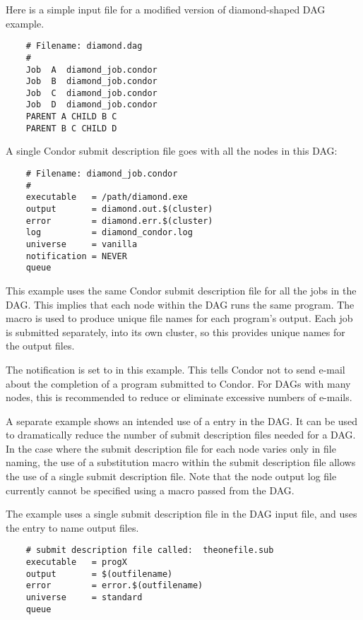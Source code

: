 Here is a simple input file for a 
modified version of diamond-shaped DAG example.

\begin{verbatim}
	# Filename: diamond.dag
	#
	Job  A  diamond_job.condor 
	Job  B  diamond_job.condor 
	Job  C  diamond_job.condor	
	Job  D  diamond_job.condor
	PARENT A CHILD B C
	PARENT B C CHILD D
\end{verbatim}

A single Condor submit description file goes with all the nodes
in this DAG:

\begin{verbatim}
	# Filename: diamond_job.condor
	#
	executable   = /path/diamond.exe
	output       = diamond.out.$(cluster)
	error        = diamond.err.$(cluster)
	log          = diamond_condor.log
	universe     = vanilla
	notification = NEVER
	queue
\end{verbatim}

This example uses the same Condor submit description file
for all the jobs in the DAG.
This implies that each node within the DAG runs the
same program.
The  macro
is used to produce unique file names for each program's output.
Each job is submitted separately, into its own cluster,
so this provides unique names for the output files.

The notification is set to \verb@NEVER@ in this example.
This tells Condor not to send e-mail about the completion of a program
submitted to Condor.
For DAGs with many nodes, this is recommended
to reduce or eliminate excessive numbers of e-mails.

A separate example shows an intended use of a  entry
in the DAG.
It can be used to dramatically reduce the number of submit description
files needed for a DAG.
In the case where the submit description file for each node
varies only in file naming, the use of a substitution macro
within the submit description file allows the use of 
a single submit description file.
Note that the node output log file currently cannot be
specified using a macro passed from the DAG.

The example uses a single submit description file in the DAG input
file, and uses the  entry to name output files.

\begin{verbatim}
	# submit description file called:  theonefile.sub
	executable   = progX
	output       = $(outfilename)
	error        = error.$(outfilename)
	universe     = standard
	queue
\end{verbatim}

